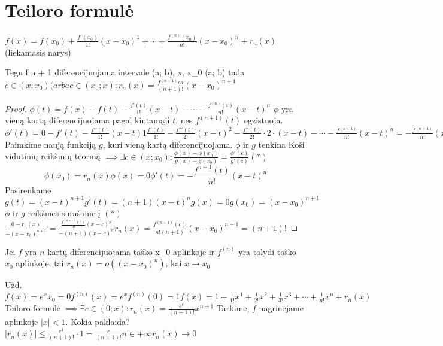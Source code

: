 \chapter{Teiloro formulė}
$f(x) = f(x_0) + \frac{f'(x_0)}{1!}(x - x_0)^1 + \cdots
        + \frac{f^{(n)}(x_0)}{n!}(x - x_0)^n + r_n(x)$ (liekamasis narys)
\begin{prop}
  Tegu f n + 1 diferencijuojama intervale (a; b), x, x_0 \in (a; b)
  tada $c \in (x; x_0) (arba c \in (x_0; x)
        : r_n(x) = \frac{f^{(n + 1)}{c}a}{(n + 1)!}(x - x_0)^{n + 1}$
  \begin{proof}
    $\phi(t) = f(x) - f(t) - \frac{f'(t)}{1!}(x - t) - \cdots
               - \frac{f^{(n)}(t)}{n!}(x - t)^n$
    $\phi$ yra vieną kartą diferencijuojama pagal kintamąjį $t$,
    nes $f^{(n + 1)}(t)$ egzistuoja.
    $\phi'(t) = 0 - f'(t) - \frac{f''(t)}{1!}(x - t) 1 \frac{f'(t)}{1!}
                - \frac{f'''(t)}{2!}(x - t)^2
                - \frac{f''(t)}{2!} \cdot 2 \cdot (x - t) - \cdots
                - \frac{f^{(n + 1)}}{n!}(x - t)^n
              = - \frac{f^{(n + 1)}}{n!}(x - t)^n$
    Paimkime naują funkciją $g$, kuri vieną kartą diferencijuojama.
    $\phi$ ir $g$ tenkina Koši vidutinių reikšmių teormą
    $\implies \exists c \in (x; x_0) : \frac{\phi(x) - \phi(x_0)}{g(x) - g(x_0)} = \frac{\phi'(c)}{g'(c)} (*)$
    \[
      \phi(x_0) = r_n(x)
      \phi(x) = 0
      \phi'(t) = - \frac{f^{n + 1}(t)}{n!}(x - t)^n
    \]
    Pasirenkame $g(t) = (x - t)^{n + 1}
    g'(t) = (n + 1)(x - t)^n
    g(x) = 0
    g(x_0) = (x - x_0)^{n + 1}$
    $\phi$ ir $g$ reikšmes surašome į $(*)$
    $\frac{0 - r_n(x)}{-(x - x_0)^{n + 1}}
      = \frac{\frac{f^{(n + 1)}(c)}{n!}(x - c)^n}{-(n + 1)(x - c)^n}
      r_n(x) = \frac{f^{(n + 1)}(c)}{n!(n + 1)}(x - x_0)^{n + 1} = (n + 1)!$
  \end{proof}
\end{prop}

\begin{prop}
  Jei $f$ yra $n$ kartų diferencijuojama taško x_0 aplinkoje ir $f^{(n)}$
  yra tolydi taško $x_0$ aplinkoje, tai
  $r_n(x) = o((x - x_0)^n)$, kai $x \to x_0$
\end{prop}

Užd.
$f(x) = e^x
x_0 = 0
f^{(n)}(x) = e^x
f^{(n)}(0) = 1
f(x) = 1 + \frac{1}{1!}x^1 + \frac{1}{2!}x^2 + \frac{1}{3!}x^3 + \cdots
       + \frac{1}{n!}x^n + r_n(x)$
Teiloro formulė
$\implies \exists c \in (0; x) : r_n(x) = \frac{e^c}{(n + 1)!}x^{n + 1}$
Tarkime, $f$ nagrinėjame aplinkoje $|x| < 1$. Kokia paklaida?
$|r_n(x)| \leq \frac{e^1}{(n + 1)!} \cdot 1 = \frac{e}{(n + 1)!}
n \in +\infty r_n(x) \to 0$

